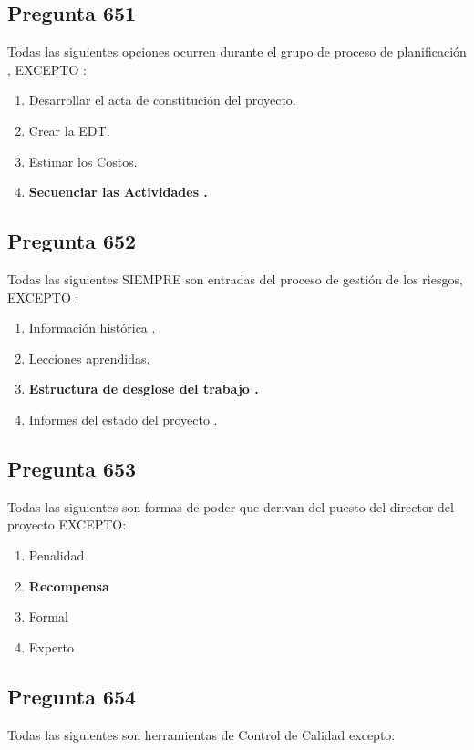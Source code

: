 \documentclass[11pt,a4paper]{article}
\begin{document}
\subsection*{Pregunta 651}
Todas las siguientes opciones ocurren durante el grupo de proceso de planificación , EXCEPTO :

\begin{enumerate}[label=\alph*)]
  \item Desarrollar el acta de constitución del proyecto.
  \item Crear la EDT.
  \item Estimar los Costos.
  \item \textbf{Secuenciar las Actividades .}
\end{enumerate}

\subsection*{Pregunta 652}
Todas las siguientes SIEMPRE son entradas del proceso de gestión de los riesgos, EXCEPTO :

\begin{enumerate}[label=\alph*)]
  \item Información histórica .
  \item Lecciones aprendidas.
  \item \textbf{Estructura de desglose del trabajo .}
  \item Informes del estado del proyecto .
\end{enumerate}

\subsection*{Pregunta 653}
Todas las siguientes son formas de poder que derivan del puesto del director del proyecto EXCEPTO:

\begin{enumerate}[label=\alph*)]
  \item Penalidad
  \item \textbf{Recompensa}
  \item Formal
  \item Experto
\end{enumerate}

\subsection*{Pregunta 654}
Todas las siguientes son herramientas de Control de Calidad excepto:
\end{document}
